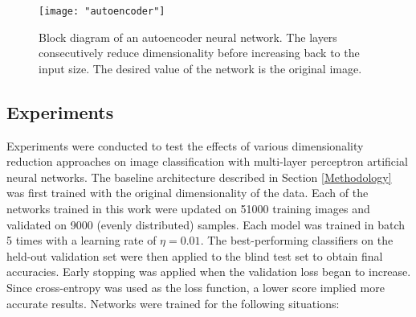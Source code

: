 \documentclass[conference]{IEEEtran}
\begin{document}
\begin{center}
	\begin{figure}[t]
		\centering
		\texttt{[image: "autoencoder"]}
		\caption{Block diagram of an autoencoder neural network.  The layers consecutively reduce dimensionality before increasing back to the input size.  The desired value of the network is the original image.}
		\label{fig:autoencoder}
	\end{figure}
\end{center}


\subsection{Experiments} \label{Experiments}
Experiments were conducted to test the effects of various dimensionality reduction approaches on image classification with multi-layer perceptron artificial neural networks.  The baseline architecture described in Section \ref{Methodology} was first trained with the original dimensionality of the data.  Each of the networks trained in this work were updated on 51000 training images and validated on 9000 (evenly distributed) samples.  Each model was trained in batch 5 times with a learning rate of $\eta=0.01$. The best-performing classifiers on the held-out validation set were then applied to the blind test set to obtain final accuracies.  Early stopping was applied when the validation loss began to increase.  Since cross-entropy was used as the loss function, a lower score implied more accurate results.  Networks were trained for the following situations:
\end{document}
